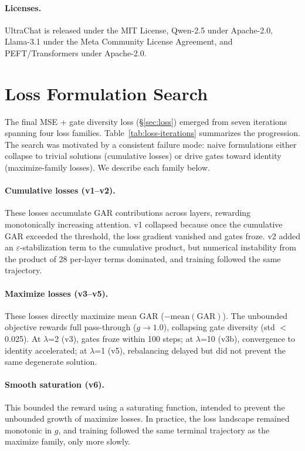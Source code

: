 \paragraph{Licenses.} UltraChat is released under the MIT License, Qwen-2.5 under Apache-2.0, Llama-3.1 under the Meta Community License Agreement, and PEFT/Transformers under Apache-2.0.

\section{Loss Formulation Search}\label{sec:appendix-loss}

The final MSE + gate diversity loss (\S\ref{sec:loss}) emerged from seven iterations spanning four loss families. Table~\ref{tab:loss-iterations} summarizes the progression. The search was motivated by a consistent failure mode: naive formulations either collapse to trivial solutions (cumulative losses) or drive gates toward identity (maximize-family losses). We describe each family below.

\paragraph{Cumulative losses (v1--v2).} These losses accumulate GAR contributions across layers, rewarding monotonically increasing attention. v1 collapsed because once the cumulative GAR exceeded the threshold, the loss gradient vanished and gates froze. v2 added an $\varepsilon$-stabilization term to the cumulative product, but numerical instability from the product of 28 per-layer terms dominated, and training followed the same trajectory.

\paragraph{Maximize losses (v3--v5).} These losses directly maximize mean GAR ($-\text{mean}(\text{GAR})$). The unbounded objective rewards full pass-through ($g \to 1.0$), collapsing gate diversity (std $<$ 0.025). At $\lambda$=2 (v3), gates froze within 100 steps; at $\lambda$=10 (v3b), convergence to identity accelerated; at $\lambda$=1 (v5), rebalancing delayed but did not prevent the same degenerate solution.

\paragraph{Smooth saturation (v6).} This bounded the reward using a saturating function, intended to prevent the unbounded growth of maximize losses. In practice, the loss landscape remained monotonic in $g$, and training followed the same terminal trajectory as the maximize family, only more slowly.

